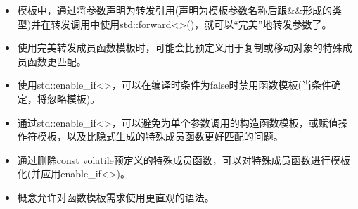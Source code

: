 
\begin{itemize}
\item 
模板中，通过将参数声明为转发引用(声明为模板参数名称后跟\&\&形成的类型)并在转发调用中使用std::forward<>()，就可以“完美”地转发参数了。

\item 
使用完美转发成员函数模板时，可能会比预定义用于复制或移动对象的特殊成员函数更匹配。

\item 
使用std::enable\_if<>，可以在编译时条件为false时禁用函数模板(当条件确定，将忽略模板)。

\item 
通过std::enable\_if<>，可以避免为单个参数调用的构造函数模板，或赋值操作符模板，以及比隐式生成的特殊成员函数更好匹配的问题。

\item 
通过删除const volatile预定义的特殊成员函数，可以对特殊成员函数进行模板化(并应用enable\_if<>)。

\item 
概念允许对函数模板需求使用更直观的语法。
\end{itemize}